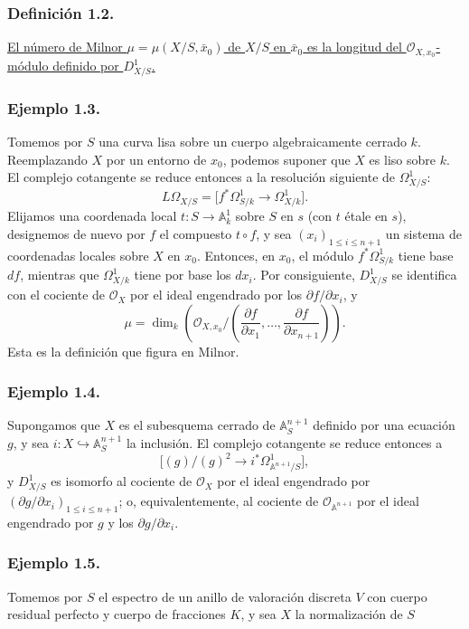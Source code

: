 \pageoriginale

\subsubsection*{Definición 1.2.}
\underline{El número de Milnor
$\mu=\mu(X/S,\bar x_0)$ de $X/S$ en $\bar x_0$ es la longitud del
$\mathcal O_{X,x_0}$-módulo definido por $D^1_{X/S}$.}

\subsubsection*{Ejemplo 1.3.}
Tomemos por $S$ una curva lisa sobre un cuerpo algebraicamente cerrado
$k$. Reemplazando $X$ por un entorno de $x_0$, podemos suponer que
$X$ es liso sobre $k$. El complejo cotangente se reduce entonces a la
resolución siguiente de $\Omega^1_{X/S}$:
\[
L\Omega_{X/S}
=\bigl[f^*\Omega^1_{S/k}\longrightarrow\Omega^1_{X/k}\bigr].
\]
Elijamos una coordenada local $t:S\to\mathbb A^1_k$ sobre $S$ en
$s$ (con $t$ étale en $s$), designemos de nuevo por $f$ el compuesto
$t\circ f$, y sea $(x_i)_{1\leq i\leq n+1}$ un sistema de
coordenadas locales sobre $X$ en $x_0$. Entonces, en $x_0$, el módulo
$f^*\Omega^1_{S/k}$ tiene base $df$, mientras que
$\Omega^1_{X/k}$ tiene por base los $dx_i$. Por consiguiente,
$D^1_{X/S}$ se identifica con el cociente de $\mathcal O_X$ por el
ideal engendrado por los $\partial f/\partial x_i$, y
\begin{equation}\tag{1.3.1}
\mu=\dim_k\!\left(
\mathcal O_{X,x_0}/
\left(\frac{\partial f}{\partial x_1},\ldots,
      \frac{\partial f}{\partial x_{n+1}}\right)\right).
\end{equation}
Esta es la definición que figura en Milnor.

\subsubsection*{Ejemplo 1.4.}
Supongamos que $X$ es el subesquema cerrado de $\mathbb A_S^{n+1}$
definido por una ecuación $g$, y sea
$i:X\hookrightarrow\mathbb A_S^{n+1}$ la inclusión. El complejo
cotangente se reduce entonces a
\[
\bigl[(g)/(g)^2\longrightarrow
i^*\Omega^1_{\mathbb A^{n+1}/S}\bigr],
\]
y $D^1_{X/S}$ es isomorfo al cociente de $\mathcal O_X$ por el ideal
engendrado por $(\partial g/\partial x_i)_{1\leq i\leq n+1}$; o,
equivalentemente, al cociente de $\mathcal O_{\mathbb A^{n+1}}$ por
el ideal engendrado por $g$ y los $\partial g/\partial x_i$.

\subsubsection*{Ejemplo 1.5.}
Tomemos por $S$ el espectro de un anillo de valoración discreta $V$
con cuerpo residual perfecto y cuerpo de fracciones $K$, y sea $X$
la normalización de $S$

